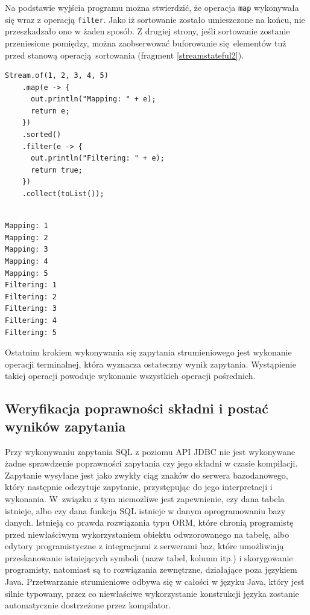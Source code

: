 \documentclass[12pt,twoside,openright]{extarticle}
\begin{document}
    Na podstawie wyjścia programu można stwierdzić, że operacja \texttt{map} wykonywała się wraz z operacją \texttt{filter}. Jako iż sortowanie zostało umieszczone na końcu, nie przeszkadzało ono w żaden sposób. Z drugiej strony, jeśli sortowanie zostanie przeniesione pomiędzy, można zaobserwować buforowanie się elementów tuż przed stanową operacją sortowania (fragment \ref{streamstateful2}).

\begin{lstlisting}[label=streamstateful2, caption=Brak fuzji operacji stanowych]
Stream.of(1, 2, 3, 4, 5)
    .map(e -> {
      out.println("Mapping: " + e);
      return e;
    })
    .sorted()
    .filter(e -> {
      out.println("Filtering: " + e);
      return true;
    })
    .collect(toList());
\end{lstlisting}

\begin{verbatim}

Mapping: 1
Mapping: 2
Mapping: 3
Mapping: 4
Mapping: 5
Filtering: 1
Filtering: 2
Filtering: 3
Filtering: 4
Filtering: 5

\end{verbatim}

    Ostatnim krokiem wykonywania się zapytania strumieniowego jest wykonanie operacji terminalnej, która wyznacza ostateczny wynik zapytania. Wystąpienie takiej operacji powoduje wykonanie wszystkich operacji pośrednich. 

\subsection{Weryfikacja poprawności składni i postać wyników zapytania}

    Przy wykonywaniu zapytania SQL z poziomu API JDBC nie jest wykonywane żadne sprawdzenie poprawności zapytania czy jego składni w czasie kompilacji. Zapytanie wysyłane jest jako zwykły ciąg znaków do serwera bazodanowego, który następnie odczytuje zapytanie, przystępując do jego interpretacji i wykonania. W~związku z tym niemożliwe jest zapewnienie, czy dana tabela istnieje, albo czy dana funkcja SQL istnieje w danym oprogramowaniu bazy danych. Istnieją co prawda rozwiązania typu ORM, które chronią programistę przed niewłaściwym wykorzystaniem obiektu odwzorowanego na tabelę, albo edytory programistyczne z integracjami z serwerami baz, które umożliwiają przeskanowanie istniejących symboli (nazw tabel, kolumn itp.) i skorygowanie programisty, natomiast są to rozwiązania zewnętrzne, działające poza językiem Java. Przetwarzanie strumieniowe odbywa się w całości w języku Java, który jest silnie typowany, przez co niewłaściwe wykorzystanie konstrukcji języka zostanie automatycznie dostrzeżone przez kompilator.
    
\end{document}
